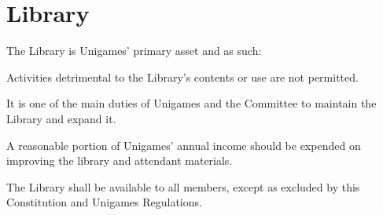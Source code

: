 \documentclass[a4paper]{article}
\begin{document}
\section{Library} \label{sec:library}
\begin{myEnumerate}
    \item The Library is Unigames' primary asset and as such:
          \begin{myEnumerate}
              \item Activities detrimental to the Library's contents or use are not permitted.
              \item It is one of the main duties of Unigames and the Committee to maintain the Library and expand it.
              \item A reasonable portion of Unigames' annual income should be expended on improving the library and attendant materials.
              \item The Library shall be available to all members, except as excluded by this Constitution and Unigames Regulations.
          \end{myEnumerate}
\end{myEnumerate}
\end{document}
